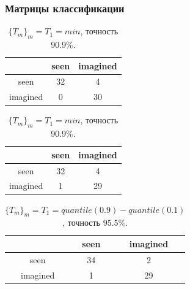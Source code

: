 \documentclass{beamer}
\begin{document}
	\begin{frame} 
		\frametitle{Матрицы классификации}
		\vspace{0.5cm}	

		\begin{table}
			\begin{minipage}{.5\linewidth}				
				\begin{tabular}{c|cc}
					& \multicolumn{1}{c|}{seen} & imagined \\ \hline
					seen     & 32                        & 4        \\ \cline{1-1}
					imagined & 0                         & 30      
				\end{tabular}
				\caption{$\{T_m\}_m = T_1 = mean$, точность $93.9\%$.}
			\end{minipage}%
			\begin{minipage}{.5\linewidth}				
				\begin{tabular}{c|cc}
					& \multicolumn{1}{c|}{seen} & imagined \\ \hline
					seen     & 32                        & 4        \\ \cline{1-1}
					imagined & 1                         & 29      
				\end{tabular}
				\caption{$\{T_m\}_m = T_1 = min$, точность $90.9\%$.}
			\end{minipage} 
		\end{table}
	
		\begin{table}[]
			\begin{tabular}{c|cc}
				& \multicolumn{1}{c|}{seen} & imagined \\ \hline
				seen     & 34                        & 2        \\ \cline{1-1}
				imagined & 1                         & 29      
			\end{tabular}
			\caption{$\{T_m\}_m = T_1 = quantile(0.9) - quantile(0.1)$, точность $95.5\%$.}
		\end{table}
	\end{frame}
		
		
\end{document}
